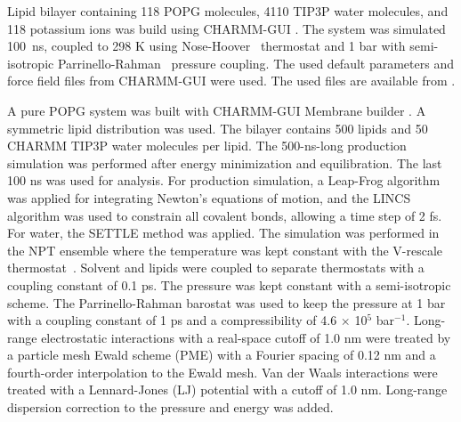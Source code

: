 \documentclass[journal=jpcbfk]{achemso}
\begin{document}
 Lipid bilayer containing 118 POPG molecules, 4110 TIP3P water molecules, and 118 potassium ions was build using CHARMM-GUI \cite{lee16}.
The system was simulated 100~ns, coupled to 298 K using Nose-Hoover~\cite{nose84,hoover85} thermostat and 1 bar with
semi-isotropic Parrinello-Rahman~\cite{parrinello81} pressure coupling.
The used default parameters and force field files from CHARMM-GUI were used.
The used files are available from .

 A pure POPG system was built with CHARMM-GUI Membrane builder \cite{lee16}. A symmetric lipid distribution was used. The bilayer contains 500 lipids and 50 CHARMM TIP3P water molecules per lipid.
The 500-ns-long production simulation was performed after energy minimization and equilibration.
The last 100 ns was used for analysis.
For production simulation, a Leap-Frog algorithm was applied for integrating Newton's equations of motion, and the LINCS algorithm was used to constrain all covalent bonds, allowing a time step of 2 fs. For water, the SETTLE method was applied. The simulation was performed in the NPT ensemble where the temperature was kept constant with the V-rescale thermostat~\cite{bussi07}. Solvent and lipids were coupled to separate thermostats with a coupling constant of 0.1 ps. The pressure was kept constant with a semi-isotropic scheme. The Parrinello-Rahman barostat was used to keep the pressure at 1 bar with a coupling constant of 1 ps and a compressibility of 4.6 $\times$ 10$^5$ bar$^{-1}$. Long-range electrostatic interactions with a real-space cutoff of 1.0 nm were treated by a particle mesh Ewald scheme (PME) with a Fourier spacing of 0.12 nm and a fourth-order interpolation to the Ewald mesh. Van der Waals interactions were treated with a Lennard-Jones (LJ) potential with a cutoff of 1.0 nm. Long-range dispersion correction to the pressure and energy was added.
\end{document}
